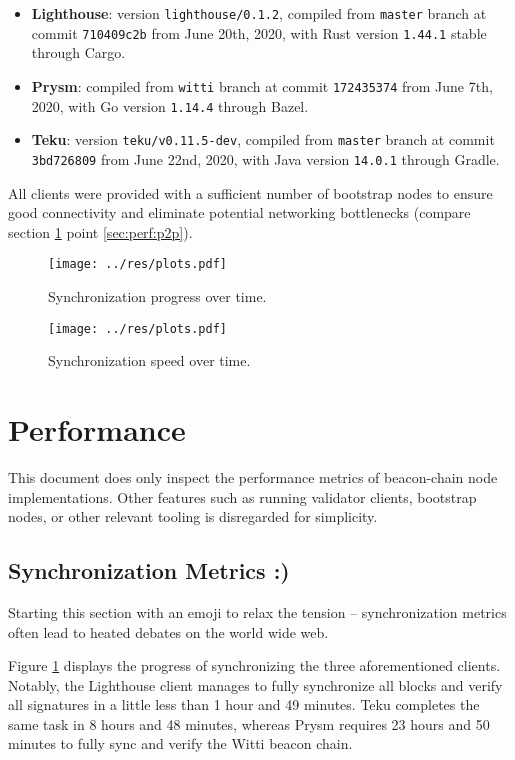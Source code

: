\documentclass[twoside,twocolumn]{article}
\begin{document}
\begin{itemize}
\item \textbf{Lighthouse}: version \texttt{lighthouse/0.1.2}, compiled from \texttt{master} branch at commit \texttt{710409c2b} from June 20th, 2020, with Rust version \texttt{1.44.1} stable through Cargo.
\item \textbf{Prysm}: compiled from \texttt{witti} branch at commit \texttt{172435374} from June 7th, 2020, with Go version \texttt{1.14.4} through Bazel.
\item \textbf{Teku}: version \texttt{teku/v0.11.5-dev}, compiled from \texttt{master} branch at commit \texttt{3bd726809} from June 22nd, 2020, with Java version \texttt{14.0.1} through Gradle.
\end{itemize}

All clients were provided with a sufficient number of bootstrap nodes to ensure good connectivity and eliminate potential networking bottlenecks (compare section \ref{sec:perf} point \ref{sec:perf:p2p}).\par

\begin{figure}[t]
	\centering
	\texttt{[image: ../res/plots.pdf]}
	\caption{Synchronization progress over time.}
	\label{img:sync:prog}
\end{figure}

\begin{figure}[t]
	\centering
	\texttt{[image: ../res/plots.pdf]}
	\caption{Synchronization speed over time.}
	\label{img:sync:sped}
\end{figure}

\section{Performance}
\label{sec:perf}
This document does only inspect the performance metrics of beacon-chain node implementations. Other features such as running validator clients, bootstrap nodes, or other relevant tooling is disregarded for simplicity.

\subsection{Synchronization Metrics :)}
Starting this section with an emoji to relax the tension -- synchronization metrics often lead to heated debates on the world wide web.\par

Figure \ref{img:sync:prog} displays the progress of synchronizing the three aforementioned clients. Notably, the Lighthouse client manages to fully synchronize all blocks and verify all signatures in a little less than 1 hour and 49 minutes. Teku completes the same task in 8 hours and 48 minutes, whereas Prysm requires 23 hours and 50 minutes to fully sync and verify the Witti beacon chain.\par
\end{document}
